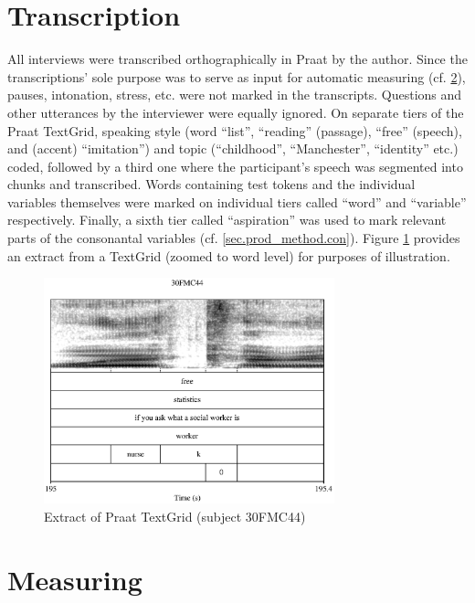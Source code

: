 	\section{Transcription}\label{sec.prod_method.transcription}

All interviews were transcribed orthographically in Praat \parencite{praat} by the author.
Since the transcriptions' sole purpose was to serve as input for automatic measuring (cf. \ref{sec.prod_method.measuring}), pauses, intonation, stress, etc. were not marked in the transcripts.
Questions and other utterances by the interviewer were equally ignored.
On separate tiers of the Praat TextGrid, speaking style (word ``list'', ``reading'' (passage), ``free'' (speech), and (accent) ``imitation'') and topic (``childhood'', ``Manchester'', ``identity'' etc.) coded, followed by a third one where the participant's speech was segmented into chunks and transcribed.
Words containing test tokens and the individual variables themselves were marked on individual tiers called ``word'' and ``variable'' respectively.
Finally, a sixth tier called ``aspiration'' was used to mark relevant parts of the consonantal variables (cf. \ref{sec.prod_method.con}).
Figure \ref{fig.textgrid.ex} provides an extract from a TextGrid (zoomed to word level) for purposes of illustration.

	\begin{figure}[h]
		\centering
			\centering
			\includegraphics[width=0.75\textwidth]{figures/TextGrid_screenshot}
		\caption{Extract of Praat TextGrid (subject 30FMC44)}
		\label{fig.textgrid.ex}
	\end{figure}

	\section{Measuring}\label{sec.prod_method.measuring}

